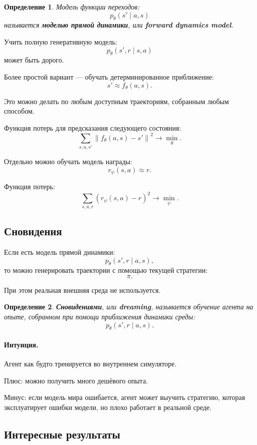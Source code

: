 \documentclass[12pt,a4paper]{article}
\newtheorem{definition}{Определение}
\begin{document}
\begin{definition}
Модель функции переходов:
\[
p_\theta(s'\mid a,s)
\]
называется \textbf{моделью прямой динамики}, или \textbf{forward dynamics model}.
\end{definition}

Учить полную генеративную модель:
\[
p_\theta(s',r\mid s,a)
\]
может быть дорого.

Более простой вариант --- обучать детерминированное приближение:
\[
s'\approx f_\theta(a,s).
\]

Это можно делать по любым доступным траекториям, собранным любым способом.

Функция потерь для предсказания следующего состояния:
\[
\sum_{s,a,s'}
\left\|
f_\theta(a,s)-s'
\right\|^2
\to
\min_\theta.
\]

Отдельно можно обучать модель награды:
\[
r_\psi(s,a)\approx r.
\]

Функция потерь:
\[
\sum_{s,a,r}
\left(
r_\psi(s,a)-r
\right)^2
\to
\min_\psi.
\]

\subsection{Сновидения}

Если есть модель прямой динамики:
\[
p_\theta(s',r\mid a,s),
\]
то можно генерировать траектории с помощью текущей стратегии:
\[
\pi.
\]

При этом реальная внешняя среда не используется.

\begin{definition}
\textbf{Сновидениями}, или \textbf{dreaming}, называется обучение агента на опыте, собранном при помощи приближения динамики среды:
\[
p_\theta(s',r\mid a,s).
\]
\end{definition}

\paragraph{Интуиция.}

Агент как будто тренируется во внутреннем симуляторе.

Плюс: можно получить много дешёвого опыта.

Минус: если модель мира ошибается, агент может выучить стратегию, которая эксплуатирует ошибки модели, но плохо работает в реальной среде.

\subsection{Интересные результаты}
\end{document}

